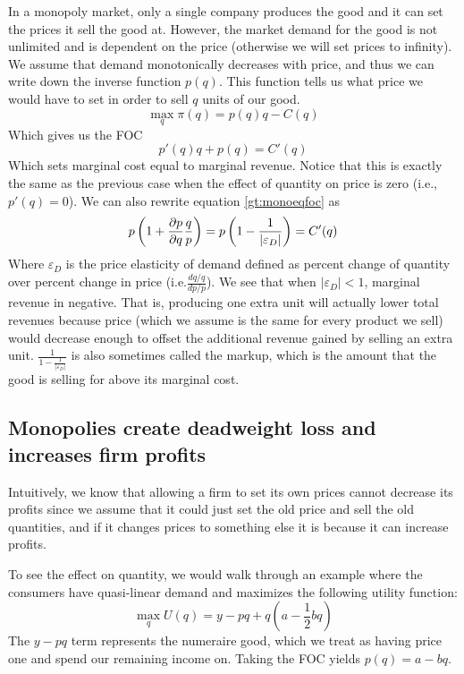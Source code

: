 In a monopoly market, only a single company produces the good and it can set the prices it sell the good at. However, the market demand for the good is not unlimited and is dependent on the price (otherwise we will set prices to infinity). We assume that demand monotonically decreases with price, and thus we can write down the inverse function $p(q)$. This function tells us what price we would have to set in order to sell $q$ units of our good.
\begin{equation}
    \max_q \pi(q) = p(q)q - C(q) \label{gt:monoeq} 
\end{equation}
Which gives us the FOC 
\begin{equation}
    p'(q)q + p(q) = C'(q) \label{gt:monoeqfoc} 
\end{equation}
Which sets marginal cost equal to marginal revenue. Notice that this is exactly the same as the previous case when the effect of quantity on price is zero (i.e., $p'(q) = 0$). We can also rewrite equation \ref{gt:monoeqfoc} as
\begin{equation}
    p\left(1 + \frac{\partial p}{\partial q}\frac{q}{p}\right) = p\left(1 - \frac{1}{|\varepsilon_D|}\right)  = C'(q)
\end{equation}
Where $\varepsilon_D$ is the price elasticity of demand defined as percent change of quantity over percent change in price (i.e.$\frac{dq/q}{dp/p}$). We see that when $|\varepsilon_D| < 1$, marginal revenue in negative. That is, producing one extra unit will actually lower total revenues because price (which we assume is the same for every product we sell) would decrease enough to offset the additional revenue gained by selling an extra unit. $\frac{1}{1 - \frac{1}{|\varepsilon_D|}}$ is also sometimes called the markup, which is the amount that the good is selling for above its marginal cost. 


\subsection*{Monopolies create deadweight loss and increases firm profits}

Intuitively, we know that allowing a firm to set its own prices cannot decrease its profits since we assume that it could just set the old price and sell the old quantities, and if it changes prices to something else it is because it can increase profits. 

To see the effect on quantity, we would walk through an example where the consumers have quasi-linear demand and maximizes the following utility function:
\begin{equation}
    \max_{q} U(q) = y - pq + q\left(a - \frac{1}{2}bq\right)
\end{equation}
The $y - pq$ term represents the numeraire good, which we treat as having price one and spend our remaining income on. Taking the FOC yields $p(q) = a - bq$.

